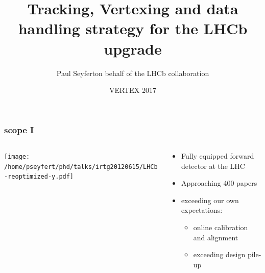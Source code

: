\documentclass[table,xcolor=dvipsnames,professionalfonts]{beamer}
\author[Paul Seyfert]{Paul Seyfert\newline on behalf of the LHCb collaboration}
\institute[CERN]{CERN}
\date[\today]{VERTEX 2017}
\title[LHCb upgrade]{Tracking, Vertexing and data handling strategy for the LHCb upgrade}
\begin{document}
\maketitle

\begin{frame}
  \frametitle{scope I}

  \begin{columns}
    \begin{column}{.65\textwidth}
      \begin{center}
        \texttt{[image: /home/pseyfert/phd/talks/irtg20120615/LHCb-reoptimized-y.pdf]}
        \hspace{-0.92\textwidth}
      \end{center}
    \end{column}
    \begin{column}{.35\textwidth}
      \begin{itemize}
        \item Fully equipped forward detector at the LHC
        \item Approaching 400 papers
        \item exceeding our own expectations:
          \begin{itemize}
              \item online calibration and alignment
              \item exceeding design pile-up
          \end{itemize}
      \end{itemize}
    \end{column}
    \end{columns}
    \end{frame}
\end{document}
